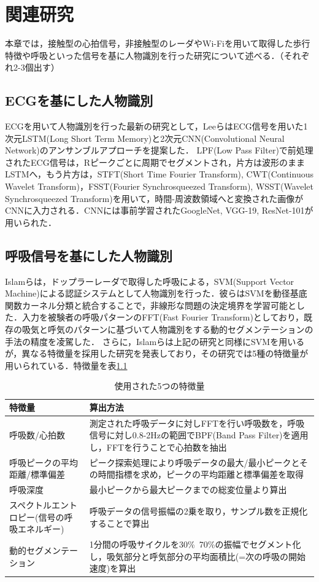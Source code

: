 \chapter{関連研究}
本章では，接触型の心拍信号，非接触型のレーダやWi-Fiを用いて取得した歩行特徴や呼吸といった信号を基に人物識別を行った研究について述べる．（それぞれ2-3個出す）
\section{ECGを基にした人物識別}
ECGを用いて人物識別を行った最新の研究として，LeeらはECG信号を用いた1次元LSTM(Long Short Term Memory)と2次元CNN(Convolutional Neural Network)のアンサンブルアプローチを提案した．
LPF(Low Pass Filter)で前処理されたECG信号は，Rピークごとに周期でセグメントされ，片方は波形のままLSTMへ，もう片方は，STFT(Short Time Fourier Transform), CWT(Continuous Wavelet Transform)，FSST(Fourier Synchrosqueezed Transform), WSST(Wavelet Synchrosqueezed Transform)を用いて，時間-周波数領域へと変換された画像がCNNに入力される．CNNには事前学習されたGoogleNet, VGG-19, ResNet-101が用いられた．


\section{呼吸信号を基にした人物識別}
Islamらは，ドップラーレーダで取得した呼吸による，SVM(Support Vector Machine)による認証システムとして人物識別を行った\cite{paper:respi_svm}．彼らはSVMを動径基底関数カーネル分類と統合することで，非線形な問題の決定境界を学習可能とした．入力を被験者の呼吸パターンのFFT(Fast Fourier Transform)としており，既存の吸気と呼気のパターンに基づいて人物識別をする動的セグメンテーションの手法\cite{paper:dynamic1}\cite{paper:dynamic2}の精度を凌駕した．
さらに，Islamらは上記の研究と同様にSVMを用いるが，異なる特徴量を採用した研究を発表しており，その研究では5種の特徴量が用いられている．特徴量を表\ref{table:respi}

\begin{table}[H]
\caption{使用された5つの特徴量}
\centering
\begin{tabular}{|p{3cm}|p{6cm}|}
\hline
特徴量 & 算出方法 \\
\hline
呼吸数/心拍数 & 測定された呼吸データに対しFFTを行い呼吸数を，呼吸信号に対し0.8-2Hzの範囲でBPF(Band Pass Filter)を適用し，FFTを行うことで心拍数を抽出 \\ \hline
呼吸ピークの平均距離/標準偏差 & ピーク探索処理により呼吸データの最大/最小ピークとその時間指標を求め，ピークの平均距離と標準偏差を取得 \\ \hline
呼吸深度 & 最小ピークから最大ピークまでの総変位量より算出 \\ \hline
スペクトルエントロピー(信号の呼吸エネルギー) & 呼吸データの信号振幅の2乗を取り，サンプル数を正規化することで算出 \\ \hline
動的セグメンテーション & 1分間の呼吸サイクルを30\%~70\%の振幅でセグメント化し，吸気部分と呼気部分の平均面積比(=次の呼吸の開始速度)を算出 \\
\hline
\end{tabular}
\label{table:respi}
\end{table}

